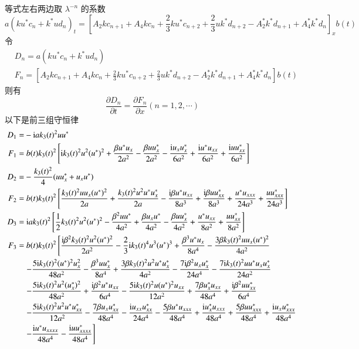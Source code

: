 等式左右两边取 $\lambda^{-n}$ 的系数
\begin{equation}
  a(ku^{*}c_{n} + k^{*}ud_{n})_{t} = \left[A_{2}kc_{n+1} + A_{4}kc_{n} + \frac{2}{3}ku^{*}c_{n+2} + \frac{2}{3}uk^{*}d_{n+2} - A_{2}^{*}k^{*}d_{n+1} + A_{4}^{*}k^{*}d_{n}\right]_{x}b(t)
\end{equation}
令
\begin{align}
  & D_{n} = a(ku^{*}c_{n} + k^{*}ud_{n}) \\
  & F_{n} = \left[A_{2}kc_{n+1} + A_{4}kc_{n} + \frac{2}{3}ku^{*}c_{n+2} + \frac{2}{3}uk^{*}d_{n+2} - A_{2}^{*}k^{*}d_{n+1} + A_{4}^{*}k^{*}d_{n}\right]b(t)
\end{align}
则有
\begin{equation}
  \frac{\partial D_{n}}{\partial t} = \frac{\partial F_{n}}{\partial x} (n = 1, 2, \cdots)
\end{equation}
以下是前三组守恒律
\begin{align}
  D_{1} =& -\mathrm{i}ak_3(t)^{2} uu^{*} \\
  F_{1} =&\ b(t)k_3(t)^{2} \left[\mathrm{i}k_3(t)^{2}u^2(u^*)^2 + \frac{\beta u^{*}u_{x}}{2a^{2}} - \frac{\beta uu^{*}_{x}}{2a^{2}} - \frac{\mathrm{i}u_{x}u^{*}_{x}}{6a^{2}} + \frac{\mathrm{i}u^{*}u_{xx}}{6a^{2}} + \frac{\mathrm{i}uu^{*}_{xx}}{6a^{2}} \right] \\
  D_{2} =& -\frac{k_{3}(t)^{2}}{4}(uu^{*}_{x} + u_{x}u^{*}) \\
  F_{2} =&\ b(t)k_3(t)^{2} \left[\frac{k_3(t)^{2}uu_x(u^*)^2}{2a} + \frac{k_3(t)^2u^2u^*u^*_x}{2a} -\frac{\mathrm{i}\beta u^*u_{xx}}{8a^3} + \frac{\mathrm{i}\beta uu^*_{xx}}{8a^3} + \frac{u^*u_{xxx}}{24a^3} + \frac{uu^*_{xxx}}{24a^3}  \right] \\
  D_{3} =&\ \mathrm{i}ak_3(t)^2\left[\frac{1}{2}k_3(t)^2u^2(u^*)^2 - \frac{\beta^2 uu^*}{4a^2} + \frac{\beta u_xu^*}{4a^2} - \frac{\beta uu^*_x}{4a^2} + \frac{u^*u_{xx}}{8a^2} + \frac{uu^*_{xx}}{8a^2}\right] \\
  F_{3} =&\ b(t)k_3(t)^{2} \left[ \frac{\mathrm{i}\beta^2k_3(t)^2u^2(u^*)^2}{2a^2} - \frac{2}{3}\mathrm{i}k_3(t)^4u^3(u^*)^3 + \frac{\beta^3 u^*u_x}{8a^4} - \frac{3\beta k_3(t)^2uu_x(u^*)^2}{4a^2} \right. \notag \\
  & \left.- \frac{5\mathrm{i}k_3(t)^2(u^*)^2u_x^2}{48a^2} - \frac{\beta^3uu^*_x}{8a^4} + \frac{3\beta k_3(t)^2u^2u^*u^*_x}{4a^2} - \frac{7\mathrm{i}\beta^2u_xu^*_x}{24a^4} - \frac{7\mathrm{i}k_3(t)^2uu^*u_xu^*_x}{24a^2} \right. \notag\\
  & \left. -\frac{5\mathrm{i}k_3(t)^2u^2(u^*_x)^2}{48a^2} + \frac{\mathrm{i}\beta^2u^*u_{xx}}{6a^4} - \frac{5\mathrm{i}k_3(t)^2u(u^*)^2u_{xx}}{12a^2} + \frac{7\beta u^*_xu_{xx}}{48a^4} + \frac{\mathrm{i}\beta^2uu^*_{xx}}{6a^4} \right. \notag\\
  & \left.  - \frac{5\mathrm{i}k_3(t)^2u^2u^*u^*_{xx}}{12a^2} -\frac{7\beta u_xu^*_{xx}}{48a^4} - \frac{\mathrm{i}u_{xx}u^*_{xx}}{24a^4} - \frac{5\beta u^*u_{xxx}}{48a^4} + \frac{\mathrm{i}u^*_xu_{xxx}}{48a^4} + \frac{5\beta uu^*_{xxx}}{48a^4} + \frac{\mathrm{i}u_xu^*_{xxx}}{48a^4}  \right. \notag\\
  & \left. - \frac{\mathrm{i}u^*u_{xxxx}}{48a^4} - \frac{\mathrm{i}uu^*_{xxxx}}{48a^4} \right]
\end{align}

